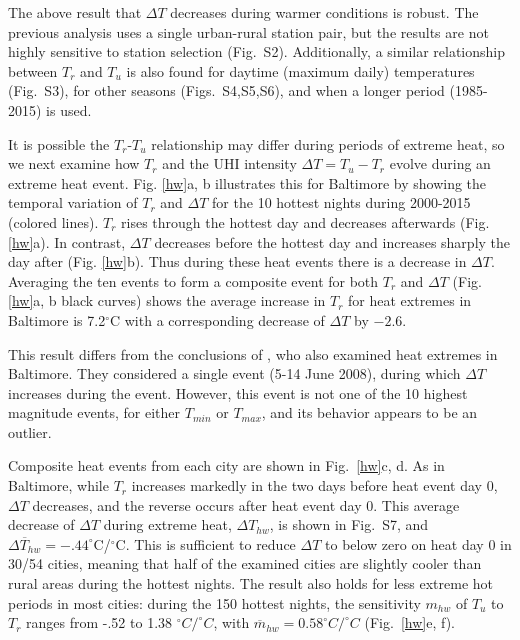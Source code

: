 \documentclass[12pt]{iopart}
\begin{document}
{The above result that $\Delta T$ decreases during warmer conditions is robust. The previous analysis uses a single urban-rural station pair, but the results are not highly sensitive to station selection (Fig.~S2). 
Additionally, a similar relationship between $T_r$ and $T_u$ is also found for daytime (maximum daily) temperatures (Fig.~S3), for other seasons (Figs.~S4,S5,S6), and when a longer period (1985-2015) is used. 

It is possible the $T_r$-$T_u$ relationship may differ during periods of extreme heat, so we next examine how $T_r$ and the UHI intensity $\Delta T= T_u - T_r$ evolve during an extreme heat event. Fig. \ref{hw}a, b illustrates this for Baltimore by showing the temporal variation of $T_r$ and $\Delta T$ for the 10 hottest nights during 2000-2015 (colored lines). 
$T_r$ rises through the hottest day and decreases afterwards (Fig. \ref{hw}a). In contrast,  $\Delta T$ decreases before the hottest day and increases sharply the day after (Fig. \ref{hw}b). Thus during these heat events there is a decrease in $\Delta T$. 
Averaging the ten events to form a composite event for both $T_r$ and $\Delta T$ (Fig. \ref{hw}a, b black curves) shows the average increase in $T_r$ for heat extremes in Baltimore is 7.2$^\circ$C with a corresponding decrease of $\Delta T$ by $-2.6$. 

This result differs from the conclusions of , who also examined heat extremes in Baltimore. They considered a single event (5-14 June 2008), during which $\Delta T$  increases during the event. However, this event is not one of the 10 highest magnitude events, for either $T_{min}$ or $T_{max}$, and its behavior appears to be an outlier.

Composite heat events from each city are shown in Fig.~\ref{hw}c, d.
As in Baltimore, while $T_r$ increases markedly in the two days before heat event day 0, $\Delta T$ decreases, and the reverse occurs after heat event day 0. This average decrease of $\Delta T$ during extreme heat, $\Delta T_{hw}$, is shown in Fig.~S7, and $\overline{\Delta T_{hw}} = -.44 ^\circ$C/$^\circ$C. This is sufficient to reduce $\Delta T$ to below zero on heat day 0 in 30/54 cities, meaning that half of the examined cities are slightly cooler than rural areas during the hottest nights. 
The result also holds for less extreme hot periods in most cities: during the 150 hottest nights, the sensitivity $m_{hw}$ of $T_u$ to $T_r$ ranges from -.52 to 1.38 $^\circ C/ ^\circ C$, with $\overline{m}_{hw} = 0.58 ^\circ C/ ^\circ C$ (Fig.~\ref{hw}e, f). 

}
\end{document}
